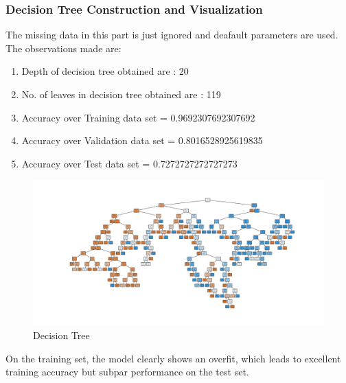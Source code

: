 \documentclass[11pt]{article}
\begin{document}
\subsubsection{Decision Tree Construction and Visualization}
The missing data in this part is just ignored and deafault parameters are used. The observations made are:
\begin{enumerate}
\item Depth of decision tree obtained are : 20
\item No. of leaves in decision tree obtained are : 119
\item Accuracy over Training data set = 0.9692307692307692
\item Accuracy over Validation data set = 0.8016528925619835
\item Accuracy over Test data set = 0.7272727272727273
\end{enumerate}

\begin{figure}[H]
  \includegraphics[width=\linewidth]{1_a_decision_tree.png}
  \caption{Decision Tree}
  \label{fig1A}
\end{figure}
On the training set, the model clearly shows an overfit, which leads to excellent training accuracy but subpar performance on the test set.
\end{document}
